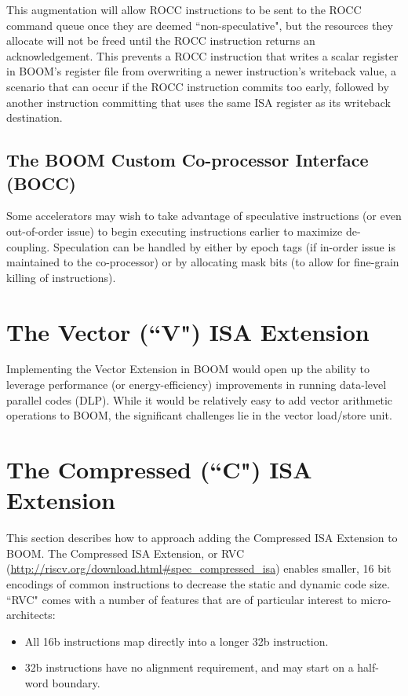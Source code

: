 This augmentation will allow ROCC instructions to be sent to the ROCC command queue once they are deemed ``non-speculative", but the resources they allocate will not be freed until the ROCC instruction returns an acknowledgement.  This prevents a ROCC instruction that writes a scalar register in BOOM's register file from overwriting a newer instruction's writeback value, a scenario that can occur if the ROCC instruction commits too early, followed by another instruction committing that uses the same ISA register as its writeback destination. 


\subsection{The BOOM Custom Co-processor Interface (BOCC)}

Some accelerators may wish to take advantage of speculative instructions (or even out-of-order issue) to begin executing instructions earlier to maximize de-coupling.  Speculation can be handled by either by epoch tags (if in-order issue is maintained to the co-processor) or by allocating mask bits (to allow for fine-grain killing of instructions). 

\section{The Vector (``V") ISA Extension}

Implementing the Vector Extension in BOOM would open up the ability to leverage performance (or energy-efficiency) improvements in running data-level parallel codes (DLP).  While it would be relatively easy to add vector arithmetic operations to BOOM, the significant challenges lie in the vector load/store unit. 


\section{The Compressed (``C") ISA Extension}

This section describes how to approach adding the Compressed ISA Extension to BOOM.  The Compressed ISA Extension, or RVC  (\url{http://riscv.org/download.html#spec_compressed_isa}) enables smaller, 16 bit encodings of common instructions to decrease the static and dynamic code size.  ``RVC" comes with a number of features that are of particular interest to micro-architects:

\begin{itemize}
\item All 16b instructions map directly into a longer 32b instruction. 
\item 32b instructions have no alignment requirement, and may start on a half-word boundary.
\end{itemize}

